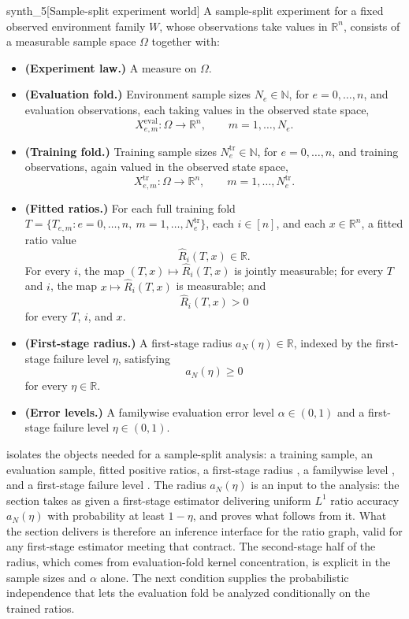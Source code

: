 \documentclass[11pt]{article}
\begin{document}
\begin{definitionv}{synth_5}[Sample-split experiment world]
A sample-split experiment for a fixed observed environment family \(W\), whose observations take values in \(\mathbb R^n\), consists of a measurable sample space \(\Omega\) together with:
\begin{itemize}
\item \textbf{(Experiment law.)} A measure on \(\Omega\).
\item \textbf{(Evaluation fold.)} Environment sample sizes \(N_e\in\mathbb N\), for \(e=0,\ldots,n\), and evaluation observations, each taking values in the observed state space,
\[
X^{\mathrm{eval}}_{e,m}:\Omega\to\mathbb R^n,
\qquad
m=1,\ldots,N_e .
\]
\item \textbf{(Training fold.)} Training sample sizes \(N^{\mathrm{tr}}_e\in\mathbb N\), for \(e=0,\ldots,n\), and training observations, again valued in the observed state space,
\[
X^{\mathrm{tr}}_{e,m}:\Omega\to\mathbb R^n,
\qquad
m=1,\ldots,N^{\mathrm{tr}}_e .
\]
\item \textbf{(Fitted ratios.)} For each full training fold \(T=\{T_{e,m}:e=0,\ldots,n,\ m=1,\ldots,N^{\mathrm{tr}}_e\}\), each \(i\in[n]\), and each \(x\in\mathbb R^n\), a fitted ratio value
\[
\widehat R_i(T,x)\in\mathbb R .
\]
For every \(i\), the map \((T,x)\mapsto \widehat R_i(T,x)\) is jointly measurable; for every \(T\) and \(i\), the map \(x\mapsto \widehat R_i(T,x)\) is measurable; and
\[
\widehat R_i(T,x)>0
\]
for every \(T\), \(i\), and \(x\).
\item \textbf{(First-stage radius.)} A first-stage radius \(a_N(\eta)\in\mathbb R\), indexed by the first-stage failure level \(\eta\), satisfying
\[
a_N(\eta)\ge 0
\]
for every \(\eta\in\mathbb R\).
\item \textbf{(Error levels.)} A familywise evaluation error level \(\alpha\in(0,1)\) and a first-stage failure level \(\eta\in(0,1)\).
\end{itemize}
\end{definitionv}

 isolates the objects needed for a sample-split analysis: a training sample, an evaluation sample, fitted positive ratios, a first-stage radius , a familywise level , and a first-stage failure level . The radius \(a_N(\eta)\) is an input to the analysis: the section takes as given a first-stage estimator delivering uniform \(L^1\) ratio accuracy \(a_N(\eta)\) with probability at least \(1-\eta\), and proves what follows from it. What the section delivers is therefore an inference interface for the ratio graph, valid for any first-stage estimator meeting that contract. The second-stage half of the radius, which comes from evaluation-fold kernel concentration, is explicit in the sample sizes and \(\alpha\) alone. The next condition supplies the probabilistic independence that lets the evaluation fold be analyzed conditionally on the trained ratios.
\end{document}
